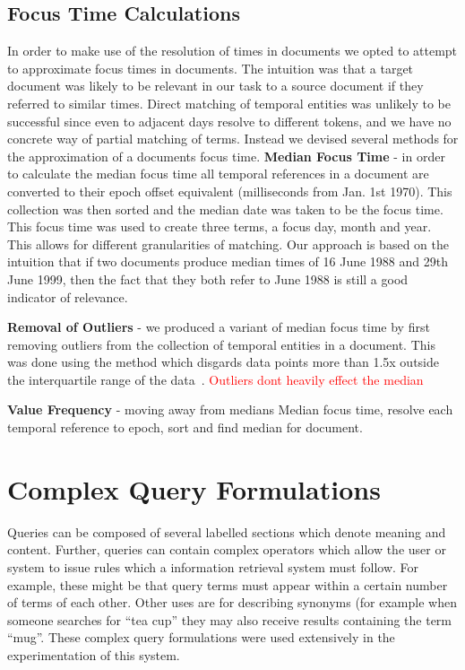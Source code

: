 \documentclass{mpaper}
\let\oldcite=\cite
\renewcommand\cite[1]{\ifthenelse{\equal{#1}{NEEDED}}{\ensuremath{^\texttt{[citation~needed]}}}{\oldcite{#1}}}
\newcommand{\remove}[1]{\textcolor{red}{#1}}
\begin{document}
\subsection{Focus Time Calculations}
In order to make use of the resolution of times in documents we opted to attempt to approximate focus times in documents. The intuition was that a target document was likely to be relevant in our task to a source document if they referred to similar times.
Direct matching of temporal entities was unlikely to be successful since even to adjacent days resolve to different tokens, and we have no concrete way of partial matching of terms.
Instead we devised several methods for the approximation of a documents focus time.
\textbf{Median Focus Time} - in order to calculate the median focus time all temporal references in a document are converted to their epoch offset equivalent (milliseconds from Jan. 1st 1970).
This collection was then sorted and the median date was taken to be the focus time.
This focus time was used to create three terms, a focus day, month and year. This allows for different granularities of matching.
Our approach is based on the intuition that if two documents produce median times of 16 June 1988 and 29th June 1999, then the fact that they both refer to June 1988 is still a good indicator of relevance.

\textbf{Removal of Outliers} - we produced a variant of median focus time by first removing outliers from the collection of temporal entities in a document. This was done using the method which disgards data points more than 1.5x outside the interquartile range of the data~\cite{NEEDED}.
\remove{Outliers dont heavily effect the median}

\textbf{Value Frequency} - moving away from medians 
Median focus time, resolve each temporal reference to epoch, sort and find median for document.

\section{Complex Query Formulations} \label{sec:complexquery}
Queries can be composed of several labelled sections which denote meaning and content. Further, queries can contain complex operators which allow the user or system to issue rules which a information retrieval system must follow. For example, these might be that query terms must appear within a certain number of terms of each other.
Other uses are for describing synonyms (for example when someone searches for ``tea cup'' they may also receive results containing the term ``mug''.
These complex query formulations were used extensively in the experimentation of this system.
\end{document}
